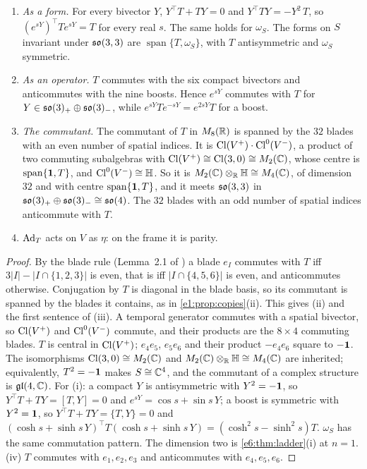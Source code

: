 \begin{proposition}
\label{e6:prop:Tform}
\begin{enumerate}[label=(\roman*),leftmargin=2.2em]
\item \emph{As a form.} For every bivector $Y$, $Y^{\!\top}T+TY=0$ and $Y^{\!\top}TY=-Y^2\,T$, so $(e^{sY})^{\!\top}Te^{sY}=T$ for every real $s$. The same holds for
$\omega_S$. The forms on $S$ invariant under $\mathfrak{so}(3,3)$ are $\operatorname{span}\{T,\omega_S\}$, with $T$ antisymmetric and $\omega_S$ symmetric.
\item \emph{As an operator.} $T$ commutes with the six compact bivectors and anticommutes with the nine boosts. Hence $e^{sY}$ commutes with $T$ for
$Y\in\mathfrak{so}(3)_+\oplus\mathfrak{so}(3)_-$, while $e^{sY}Te^{-sY}=e^{2sY}T$ for a boost.
\item \emph{The commutant.} The commutant of $T$ in $M_8(\mathbb{R})$ is spanned by the $32$ blades with an even number of spatial indices. It is
$\mathrm{Cl}(V^+)\cdot\mathrm{Cl}^0(V^-)$, a product of two commuting subalgebras with $\mathrm{Cl}(V^+)\cong\mathrm{Cl}(3,0)\cong M_2(\mathbb{C})$, whose centre is $\operatorname{span}\{\mathbf 1,T\}$, and
$\mathrm{Cl}^0(V^-)\cong\mathbb{H}$. So it is $M_2(\mathbb{C})\otimes_{\mathbb{R}}\mathbb{H}\cong M_4(\mathbb{C})$, of dimension $32$ and with centre $\operatorname{span}\{\mathbf 1,T\}$, and it meets $\mathfrak{so}(3,3)$ in
$\mathfrak{so}(3)_+\oplus\mathfrak{so}(3)_-\cong\mathfrak{so}(4)$. The $32$ blades with an odd number of spatial indices anticommute with $T$.
\item $\operatorname{Ad}_T$ acts on $V$ as $\eta$: on the frame it is parity.
\end{enumerate}
\end{proposition}

\begin{proof}
By the blade rule (Lemma~2.1 of \cite{ES17}) a blade $e_I$ commutes with $T$ iff $3|I|-|I\cap\{1,2,3\}|$ is even, that is iff $|I\cap\{4,5,6\}|$ is even,
and anticommutes otherwise. Conjugation by $T$ is diagonal in the blade basis, so its commutant is spanned by the blades it contains, as in
\cref{e1:prop:copies}(ii). This gives (ii) and the first sentence of (iii). A temporal generator commutes with a spatial bivector, so
$\mathrm{Cl}(V^+)$ and $\mathrm{Cl}^0(V^-)$ commute, and their products are the $8\times4$ commuting blades. $T$ is central in $\mathrm{Cl}(V^+)$; $e_4e_5$, $e_5e_6$ and their product
$-e_4e_6$ square to $-\mathbf 1$. The isomorphisms $\mathrm{Cl}(3,0)\cong M_2(\mathbb{C})$ and $M_2(\mathbb{C})\otimes_{\mathbb{R}}\mathbb{H}\cong M_4(\mathbb{C})$ are inherited; equivalently, $T^2=-\mathbf 1$ makes
$S\cong\mathbb{C}^4$, and the commutant of a complex structure is $\mathfrak{gl}(4,\mathbb{C})$. For (i): a compact $Y$ is antisymmetric with $Y^2=-\mathbf 1$, so
$Y^{\!\top}T+TY=[T,Y]=0$ and $e^{sY}=\cos s+\sin s\,Y$; a boost is symmetric with $Y^2=\mathbf 1$, so $Y^{\!\top}T+TY=\{T,Y\}=0$ and
$(\cosh s+\sinh s\,Y)^{\!\top}T(\cosh s+\sinh s\,Y)=(\cosh^2s-\sinh^2s)T$. $\omega_S$ has the same commutation pattern. The dimension two is
\cref{e6:thm:ladder}(i) at $n=1$. (iv) $T$ commutes with $e_1,e_2,e_3$ and anticommutes with $e_4,e_5,e_6$.
\end{proof}

